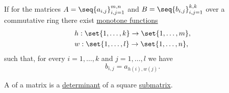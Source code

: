 \begin{definition}\label{def:submatrix}\mimprovised
  If for the matrices \( A = \seq{ a_{i,j} }_{i,j=1}^{m,n} \) and \( B = \seq{ b_{i,j} }_{i,j=1}^{k,k} \) over a commutative ring there exist \hyperref[def:order_function]{monotone functions}
  \begin{align*}
    &h: \set{ 1, \ldots, k } \to \set{ 1, \ldots, m }, \\
    &w: \set{ 1, \ldots, l } \to \set{ 1, \ldots, n },
  \end{align*}
  such that, for every \( i = 1, \ldots, k \) and \( j = 1, \ldots, l \) we have
  \begin{equation*}
    b_{i,j} = a_{h(i),w(j)}.
  \end{equation*}
\end{definition}

\begin{definition}\label{def:matrix_minor}\mimprovised
  A  of a matrix is a \hyperref[def:matrix_determinant]{determinant} of a square \hyperref[def:submatrix]{submatrix}.
\end{definition}

\medskip

